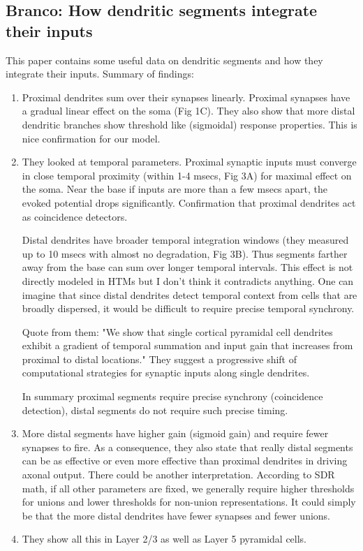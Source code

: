 \documentclass{article} %
\begin{document}
\subsection{Branco: How dendritic segments integrate their inputs}

This paper \cite{Branco2011} contains some useful data on dendritic segments
and how they integrate their inputs. Summary of findings:

\begin{enumerate}

\item Proximal dendrites sum over their synapses linearly. Proximal synapses
have a gradual linear effect on the soma (Fig 1C). They also show that more
distal dendritic branches show threshold like (sigmoidal) response properties.
This is nice confirmation for our model.

\item They looked at temporal parameters. Proximal synaptic inputs must converge
in close temporal proximity (within 1-4 msecs, Fig 3A) for maximal effect on the soma.
Near the base if inputs are more than a few msecs apart, the evoked potential
drops significantly. Confirmation that proximal dendrites act as coincidence
detectors.

Distal dendrites have broader temporal integration windows (they measured up to
10 msecs with almost no degradation, Fig 3B). Thus segments farther away from
the base can sum over longer temporal intervals.  This effect is not directly
modeled in HTMs but I don't think it contradicts anything. One can imagine that
since distal dendrites detect temporal context from cells that are broadly
dispersed, it would be difficult to require precise temporal synchrony.

Quote from them: "We show that single cortical pyramidal cell dendrites
exhibit a gradient of temporal summation and input gain that increases from
proximal to distal locations." They suggest a progressive shift of computational
strategies for synaptic inputs along single dendrites.

In summary proximal segments require precise synchrony (coincidence detection),
distal segments do not require such precise timing.

\item More distal segments have higher gain (sigmoid gain) and require fewer
synapses to fire. As a consequence, they also state that really distal segments
can be as effective or even more effective than proximal dendrites in driving
axonal output. There could be another interpretation. According to SDR math, if
all other parameters are fixed, we generally require higher thresholds for
unions and lower thresholds for non-union representations. It could simply be
that the more distal dendrites have fewer synapses and fewer unions.

\item They show all this in Layer 2/3 as well as Layer 5 pyramidal cells.

\end{enumerate}
\end{document}
